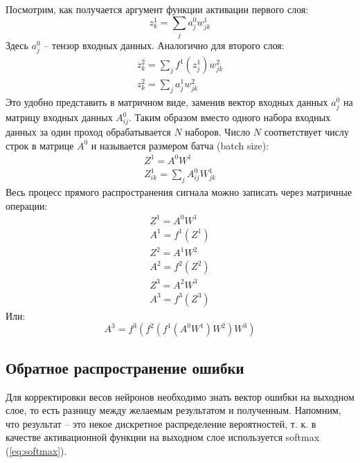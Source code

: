 \documentclass[a4paper,12pt]{article}
\theoremstyle{remark}
\begin{document}
	Посмотрим, как получается аргумент функции активации первого слоя:
	\begin{equation}
		z_k^1 = \sum_j a_j^0 w_{jk}^1
	\end{equation}
	Здесь $a_j^0$ -- тензор входных данных. Аналогично для второго слоя:
	\begin{equation}
		\begin{gathered}
			z_k^2 = \sum_j f^1(z_j^1) w_{jk}^2 \\
			z_k^2 = \sum_j a_j^1 w_{jk}^2
		\end{gathered}
	\end{equation}
	Это удобно представить в матричном виде, заменив вектор входных данных $a_j^0$ на матрицу входных данных $A_{ij}^0$. Таким образом вместо одного набора входных данных за один проход обрабатывается $N$ наборов. Число $N$ соответствует числу строк в матрице $A^0$ и называется размером батча (batch size):
	\begin{equation}
		\begin{gathered}
			Z^1 = A^0 W^1 \\
			Z_{ik}^1 = \sum_j A_{ij}^0 W_{jk}^1
		\end{gathered}
	\end{equation}
	Весь процесс прямого распространения сигнала можно записать через матричные операции:
	\begin{equation}
		\begin{gathered}
			Z^1 = A^0 W^1 \\
			A^1 = f^1(Z^1) \\
			Z^2 = A^1 W^2 \\
			A^2 = f^2(Z^2) \\
			Z^3 = A^2 W^3 \\
			A^3 = f^3(Z^3)
		\end{gathered}
	\end{equation}
	Или:
	\begin{equation}
		A^3 = f^3(f^2(f^1(A^0 W^1) W^2) W^3)
	\end{equation}
	
	\subsection{Обратное распространение ошибки}
	
	Для корректировки весов нейронов необходимо знать вектор ошибки на выходном слое, то есть разницу между желаемым результатом и полученным. Напомним, что результат -- это некое дискретное распределение вероятностей, т. к. в качестве активационной функции на выходном слое используется softmax (\ref{eq:softmax}).
	
\end{document}
